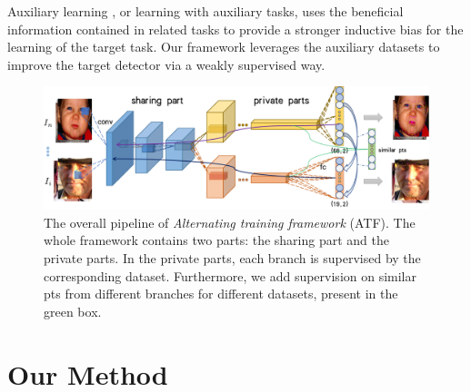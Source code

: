 \documentclass[journal,transmag]{IEEEtran}
\begin{document}

Auxiliary learning \cite{liu2019auxiliary,liebel2018auxiliary}, or learning with auxiliary tasks, uses the beneficial information contained in related tasks to provide a stronger inductive bias for the learning of the target task.
Our framework leverages the auxiliary datasets to improve the target detector via a weakly supervised way.



\begin{figure}[tbh]
   \centering
   \newpage
   \includegraphics[width=\linewidth]{resize_pipeline.pdf}
   \caption{The overall pipeline of \emph{Alternating training framework} (ATF). 
   The whole framework contains two parts: the sharing part and the private parts.
   In the private parts, each branch is supervised by the corresponding dataset.
   Furthermore, we add supervision on similar pts from different branches for different datasets, present in the green box.
   }
   \label{fig:pipeline}
\end{figure}


\section{Our Method}
\label{sec:Method}
\end{document}
